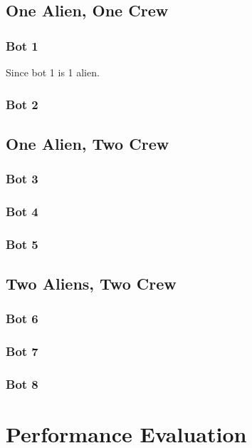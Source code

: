 \documentclass[11pt]{article}
\begin{document}
\subsection{One Alien, One Crew}

\subsubsection{Bot 1}
Since bot 1 is 1 alien.
\subsubsection{Bot 2}

\subsection{One Alien, Two Crew}

\subsubsection{Bot 3}

\subsubsection{Bot 4}

\subsubsection{Bot 5}

\subsection{Two Aliens, Two Crew}

\subsubsection{Bot 6}

\subsubsection{Bot 7}

\subsubsection{Bot 8}



\section{Performance Evaluation}
\end{document}
